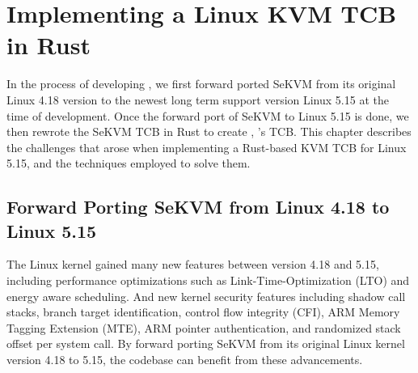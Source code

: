 \chapter{Implementing a Linux KVM TCB in Rust}
\label{sec:rewrite}



In the process of developing \rustsec{},
we first forward ported SeKVM from its original Linux 4.18 version to the
newest long term support version Linux 5.15 at the time of development.
Once the forward port of SeKVM to Linux 5.15 is done, we then rewrote the SeKVM
TCB \secore{} in Rust to create \rustcore{}, \rustsec{}'s TCB. This chapter
describes the challenges that arose when implementing a Rust-based KVM TCB for
Linux 5.15, and the techniques employed to solve them.

\section{Forward Porting SeKVM from Linux 4.18 to Linux 5.15}
The Linux kernel gained many new features between version 4.18 and 5.15,
including performance optimizations such as Link-Time-Optimization (LTO) and
energy aware scheduling. And new kernel security features including
 shadow call stacks, branch target identification, control flow
integrity (CFI), ARM Memory Tagging Extension (MTE), ARM pointer
authentication, and randomized stack offset per system call.
By forward porting SeKVM from its original Linux kernel version 4.18 to 5.15,
the codebase can benefit from these advancements.


